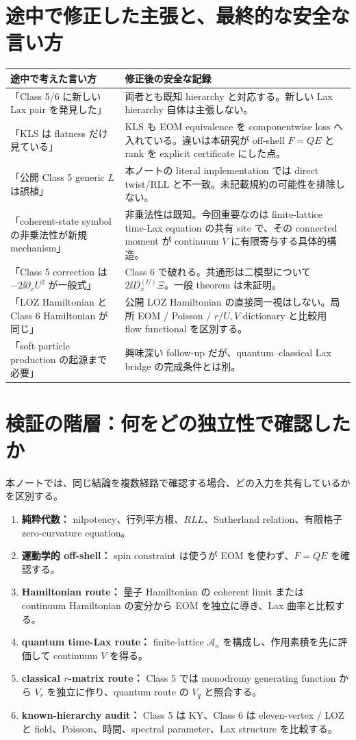 \section{途中で修正した主張と、最終的な安全な言い方}
\begin{longtable}{L{50mm}L{88mm}}
\toprule
途中で考えた言い方 & 修正後の安全な記録\\
\midrule\endhead
「Class 5/6 に新しい Lax pair を発見した」 & 両者とも既知 hierarchy と対応する。新しい Lax hierarchy 自体は主張しない。\\
「KLS は flatness だけ見ている」 & KLS も EOM equivalence を componentwise loss へ入れている。違いは本研究が off-shell $F=QE$ と rank を explicit certificate にした点。\\
「公開 Class 5 generic $L$ は誤植」 & 本ノートの literal implementation では direct twist/RLL と不一致。未記載規約の可能性を排除しない。\\
「coherent-state symbol の非乗法性が新規 mechanism」 & 非乗法性は既知。今回重要なのは finite-lattice time-Lax equation の共有 site で、その connected moment が continuum $V$ に有限寄与する具体的構造。\\
「Class 5 correction は $-2\ii\partial_xU^2$ が一般式」 & Class 6 で破れる。共通形は二模型について $2\ii D_x^{(U)}\Xi$。一般 theorem は未証明。\\
「LOZ Hamiltonian と Class 6 Hamiltonian が同じ」 & 公開 LOZ Hamiltonian の直接同一視はしない。局所 EOM / Poisson / $r/U,V$ dictionary と比較用 flow functional を区別する。\\
「soft particle production の起源まで必要」 & 興味深い follow-up だが、quantum--classical Lax bridge の完成条件とは別。\\
\bottomrule
\end{longtable}

\section{検証の階層：何をどの独立性で確認したか}
本ノートでは、同じ結論を複数経路で確認する場合、どの入力を共有しているかを区別する。
\begin{enumerate}[leftmargin=2.5em]
\item \textbf{純粋代数：} nilpotency、行列平方根、$RLL$、Sutherland relation、有限格子 zero-curvature equation。
\item \textbf{運動学的 off-shell：} spin constraint は使うが EOM を使わず、$F=QE$ を確認する。
\item \textbf{Hamiltonian route：} 量子 Hamiltonian の coherent limit または continuum Hamiltonian の変分から EOM を独立に導き、Lax 曲率と比較する。
\item \textbf{quantum time-Lax route：} finite-lattice $\mathcal A_n$ を構成し、作用素積を先に評価して continuum $V$ を得る。
\item \textbf{classical $r$-matrix route：} Class 5 では monodromy generating function から $V_r$ を独立に作り、quantum route の $V_q$ と照合する。
\item \textbf{known-hierarchy audit：} Class 5 は KY、Class 6 は eleven-vertex / LOZ と field、Poisson、時間、spectral parameter、Lax structure を比較する。
\end{enumerate}

